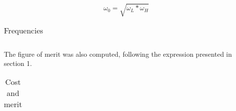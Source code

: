 \begin{equation}
\omega_{0}= \sqrt{\omega_{L} * \omega_{H}}
\end{equation}

\begin{table}[H]
\centering
\begin{tabularx}{0.6\textwidth} {
  | >{\raggedright\arraybackslash}X
  | >{\raggedleft\arraybackslash}X | }
 \hline

\end{tabularx}
\caption{Frequencies}
\end{table}

The figure of merit was also computed, following the expression presented in section 1.

\begin{table}[H]
\centering
\begin{tabularx}{0.6\textwidth} {
  | >{\raggedright\arraybackslash}X
  | >{\raggedleft\arraybackslash}X | }
 \hline

\end{tabularx}
\caption{Cost and merit}
\end{table}




